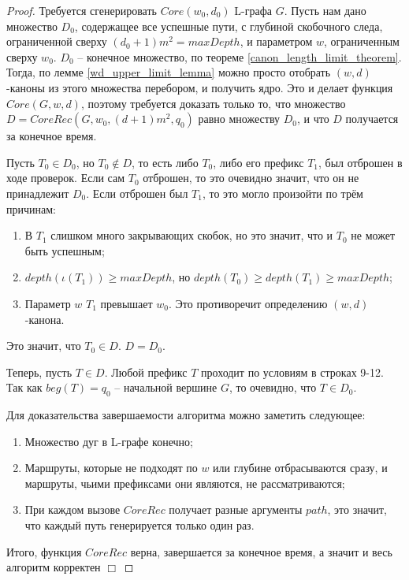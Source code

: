 \begin{proof}
    Требуется сгенерировать $Core(w_0, d_0)$ L-графа $G$. 
    Пусть нам дано множество $D_0$, содержащее все успешные пути, 
    с глубиной скобочного следа, ограниченной сверху $(d_0+1)m^2 = maxDepth$, 
    и параметром $w$, ограниченным сверху $w_0$. 
    $D_0$ -- конечное множество, по теореме \ref{canon_length_limit_theorem}.
    Тогда, по лемме \ref{wd_upper_limit_lemma} можно просто отобрать $(w,d)$-каноны из этого множества перебором, 
    и получить ядро. 
    Это и делает функция $Core(G, w, d)$, поэтому требуется доказать только то, 
    что множество $D = CoreRec(G, w_0, (d+1)m^2, q_0)$ равно множеству $D_0$, и что $D$ получается за конечное время.

    Пусть $T_0 \in D_0$, но $T_0 \notin D$, то есть либо $T_0$, либо его префикс $T_1$, был отброшен в ходе проверок.
    Если сам $T_0$ отброшен, то это очевидно значит, что он не принадлежит $D_0$.
    Если отброшен был $T_1$, то это могло произойти по трём причинам:
    \begin{enumerate}
        \item В $T_1$ слишком много закрывающих скобок, но это значит, что и $T_0$ не может быть успешным;
        \item $depth(\iota(T_1)) \ge maxDepth$, но $depth(T_0) \geq depth(T_1) \ge maxDepth$;
        \item Параметр $w$ $T_1$ превышает $w_0$. Это противоречит определению $(w,d)$-канона.
    \end{enumerate}
    Это значит, что $T_0 \in D$. $D = D_0$.

    Теперь, пусть $T \in D$. Любой префикс $T$ проходит по условиям в строках 9-12. Так как $beg(T) = q_0$ -- начальной вершине $G$,
    то очевидно, что $T \in D_0$.

    Для доказательства завершаемости алгоритма можно заметить следующее:
    \begin{enumerate}
        \item Множество дуг в L-графе конечно;
        \item Маршруты, которые не подходят по $w$ или глубине отбрасываются сразу, и маршруты, чьими префиксами они являются, не рассматриваются;
        \item При каждом вызове $CoreRec$ получает разные аргументы $path$, это значит, что каждый путь генерируется только один раз.
    \end{enumerate}

    Итого, функция $CoreRec$ верна, завершается за конечное время, а значит и весь алгоритм корректен $\Box$ 
\end{proof}

